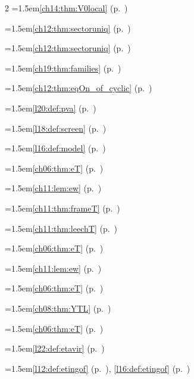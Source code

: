 \begin{multicols}{2}
\hangindent=1.5em\quad \ref{ch14:thm:V0local} (p.~\pageref{ch14:thm:V0local})\par
\hangindent=1.5em\quad \ref{ch12:thm:sectoruniq} (p.~\pageref{ch12:thm:sectoruniq})\par
\hangindent=1.5em\quad \ref{ch12:thm:sectoruniq} (p.~\pageref{ch12:thm:sectoruniq})\par
\hangindent=1.5em\quad \ref{ch19:thm:families} (p.~\pageref{ch19:thm:families})\par
\hangindent=1.5em\quad \ref{ch12:thm:eqOn_of_cyclic} (p.~\pageref{ch12:thm:eqOn_of_cyclic})\par
\hangindent=1.5em\quad \ref{l20:def:pva} (p.~\pageref{l20:def:pva})\par
\hangindent=1.5em\quad \ref{l18:def:screen} (p.~\pageref{l18:def:screen})\par
\hangindent=1.5em\quad \ref{l16:def:model} (p.~\pageref{l16:def:model})\par
\hangindent=1.5em\quad \ref{ch06:thm:eT} (p.~\pageref{ch06:thm:eT})\par
\hangindent=1.5em\quad \ref{ch11:lem:ew} (p.~\pageref{ch11:lem:ew})\par
\hangindent=1.5em\quad \ref{ch11:thm:frameT} (p.~\pageref{ch11:thm:frameT})\par
\hangindent=1.5em\quad \ref{ch11:thm:leechT} (p.~\pageref{ch11:thm:leechT})\par
\hangindent=1.5em\quad \ref{ch06:thm:eT} (p.~\pageref{ch06:thm:eT})\par
\hangindent=1.5em\quad \ref{ch11:lem:ew} (p.~\pageref{ch11:lem:ew})\par
\hangindent=1.5em\quad \ref{ch06:thm:eT} (p.~\pageref{ch06:thm:eT})\par
\hangindent=1.5em\quad \ref{ch08:thm:YTL} (p.~\pageref{ch08:thm:YTL})\par
\hangindent=1.5em\quad \ref{ch06:thm:eT} (p.~\pageref{ch06:thm:eT})\par
\hangindent=1.5em\quad \ref{l22:def:etavir} (p.~\pageref{l22:def:etavir})\par
\hangindent=1.5em\quad \ref{l12:def:etingof} (p.~\pageref{l12:def:etingof}), \ref{l16:def:etingof} (p.~\pageref{l16:def:etingof})\par

\end{multicols}
